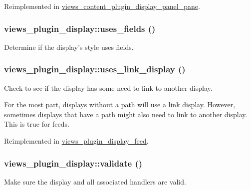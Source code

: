 Reimplemented in \hyperlink{classviews__content__plugin__display__panel__pane_a3667ee55d2a670612fe82cdbb0a5c4bd}{views\_\-content\_\-plugin\_\-display\_\-panel\_\-pane}.\hypertarget{classviews__plugin__display_a2476af1c5eb02a69a5a94d0e2f391987}{
\subsubsection[{uses\_\-fields}]{\setlength{\rightskip}{0pt plus 5cm}views\_\-plugin\_\-display::uses\_\-fields ()}}
\label{classviews__plugin__display_a2476af1c5eb02a69a5a94d0e2f391987}
Determine if the display's style uses fields. \hypertarget{classviews__plugin__display_a64d6d3c0e51efde2e050d36fbd3457dc}{
\subsubsection[{uses\_\-link\_\-display}]{\setlength{\rightskip}{0pt plus 5cm}views\_\-plugin\_\-display::uses\_\-link\_\-display ()}}
\label{classviews__plugin__display_a64d6d3c0e51efde2e050d36fbd3457dc}
Check to see if the display has some need to link to another display.

For the most part, displays without a path will use a link display. However, sometimes displays that have a path might also need to link to another display. This is true for feeds. 

Reimplemented in \hyperlink{classviews__plugin__display__feed_aa61e05dca3b82b696f6ea10356873a8b}{views\_\-plugin\_\-display\_\-feed}.\hypertarget{classviews__plugin__display_a3282edb1b32b756937fe2d0c8757c80c}{
\subsubsection[{validate}]{\setlength{\rightskip}{0pt plus 5cm}views\_\-plugin\_\-display::validate ()}}
\label{classviews__plugin__display_a3282edb1b32b756937fe2d0c8757c80c}
Make sure the display and all associated handlers are valid.

